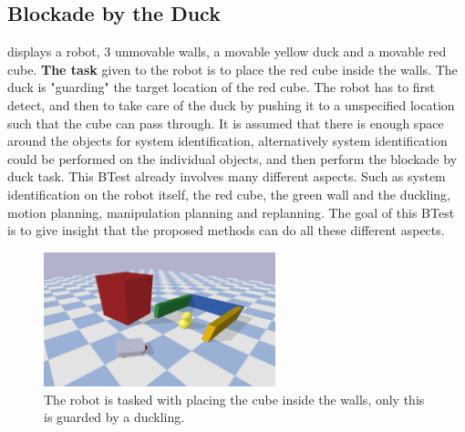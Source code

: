 \subsection{Blockade by the Duck}
 displays a robot, 3 unmovable walls, a movable yellow duck and a movable red cube. \textbf{The task} given to the robot is to place the red cube inside the walls. The duck is "guarding" the target location of the red cube. The robot has to first detect, and then to take care of the duck by pushing it to a unspecified location such that the cube can pass through. It is assumed that there is enough space around the objects for system identification, alternatively system identification could be performed on the individual objects, and then perform the blockade by duck task. This BTest already involves many different aspects. Such as system identification on the robot itself, the red cube, the green wall and the duckling, motion planning, manipulation planning and replanning. The goal of this BTest is to give insight that the proposed methods can do all these different aspects.

\begin{figure}[H]
    \centering
    \includegraphics[width=0.6\textwidth]{figures/blockade/blockade_by_duck.png}
    \caption{The robot is tasked with placing the cube inside the walls, only this is guarded by a duckling.}
    \label{figure: blockade_by_duck}
\end{figure}


